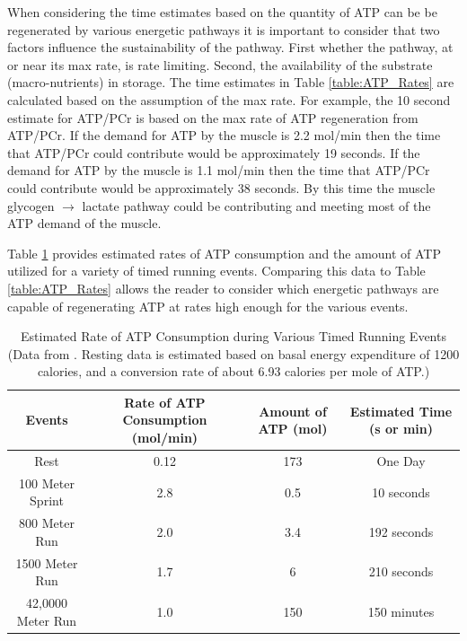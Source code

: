When considering the time estimates based on the quantity of ATP can be be regenerated by various energetic pathways it is important to consider that two factors influence the sustainability of the pathway. First whether the pathway, at or near its max rate, is rate limiting. Second, the availability of the substrate (macro-nutrients) in storage. The time estimates in Table \ref{table:ATP_Rates} are calculated based on the assumption of the max rate. For example, the 10 second estimate for ATP/PCr is based on the max rate of ATP regeneration from ATP/PCr. If the demand for ATP by the muscle is 2.2 mol/min then the time that ATP/PCr could contribute would be approximately 19 seconds. If the demand for ATP by the muscle is 1.1 mol/min then the time that ATP/PCr could contribute would be approximately 38 seconds. By this time the muscle glycogen $\rightarrow$ lactate pathway could be contributing and meeting most of the ATP demand of the muscle. 


Table \ref{table:Event_ATP_Rates} provides estimated rates of ATP consumption and the amount of ATP utilized for a variety of timed running events. Comparing this data to Table \ref{table:ATP_Rates} allows the reader to consider which energetic pathways are capable of regenerating ATP at rates high enough for the various events.


\begin{table}[h!]
\centering
\begin{tabular}{||c c c c||} 
 \hline
Events & Rate of ATP Consumption (mol/min) & Amount of ATP (mol) & Estimated Time (s or min)\\ [0.5ex] 
 \hline\hline
 Rest & 0.12  & 173 & One Day \\
 100 Meter Sprint & 2.8 & 0.5 & 10 seconds \\ 
 800 Meter Run & 2.0 & 3.4 & 192 seconds\\
 1500 Meter Run & 1.7 & 6 & 210 seconds \\ 
 42,0000 Meter Run & 1.0 & 150 & 150 minutes \\[1ex] 
 \hline
\end{tabular}
\caption{Estimated Rate of ATP Consumption during Various Timed Running Events (\footnotesize{Data from \cite{feher_quantitative_2017}. Resting data is estimated based on basal energy expenditure of 1200 calories, and a conversion rate of about 6.93 calories per mole of ATP.})}
\label{table:Event_ATP_Rates}
\end{table}
 
